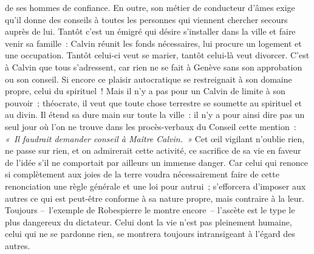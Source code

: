\documentclass[french,twoside]{book} %
\begin{document}
de ses hommes de confiance. En outre, son métier de conducteur d’âmes exige qu’il donne des conseils à toutes les personnes qui viennent chercher secours auprès de lui. Tantôt c’est un émigré qui désire s’installer dans la ville et faire venir sa famille : Calvin réunit les fonds nécessaires, lui procure un logement et une occupation. Tantôt celui-ci veut se marier, tantôt celui-là veut divorcer. C’est à Calvin que tous s’adressent, car rien ne se fait à Genève sans son approbation ou son conseil. Si encore ce plaisir autocratique se restreignait à son domaine propre, celui du spirituel ! Mais il n’y a pas pour un Calvin de limite à son pouvoir ; théocrate, il veut que toute chose terrestre se soumette au spirituel et au divin. Il étend sa dure main sur toute la ville : il n’y a pour ainsi dire pas un seul jour où l’on ne trouve dans les procès-verbaux du Conseil cette mention : \emph{« Il faudrait demander conseil à Maître Calvin. »} Cet œil vigilant n’oublie rien, ne passe sur rien, et on admirerait cette activité, ce sacrifice de sa vie en faveur de l’idée s’il ne comportait par ailleurs un immense danger. Car celui qui renonce si complètement aux joies de la terre voudra nécessairement faire de cette renonciation une règle générale et une loi pour autrui ; s’efforcera d’imposer aux autres ce qui est peut-être conforme à sa nature propre, mais contraire à la leur. Toujours – l’exemple de Robespierre le montre encore – l’ascète est le type le plus dangereux du dictateur. Celui dont la vie n’est pas pleinement humaine, celui qui ne se pardonne rien, se montrera toujours intransigeant à l’égard des autres.\par
\end{document}
